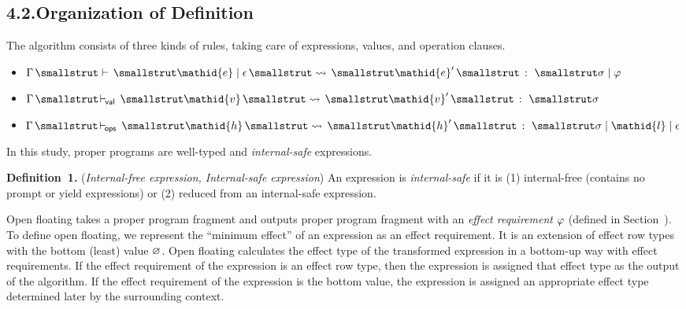 \documentclass{llncs}
\newcommand{\midbar}{\mid}
\newcommand{\xcolon}{\,:\,}
\begin{document}
\subsection{4.2.\hspace*{0.5em}Organization of Definition}%

\noindent The algorithm consists of three kinds of rules, taking care of expressions, values, and operation clauses.%

\begin{itemize}[noitemsep,topsep=\mdcompacttopsep]%

\item$\mathpre{\Gamma{}~\vdash{}~\mathid{e}\midbar{}{\epsilon}~{\;\rightsquigarrow}\;~\mathid{e}'~\xcolon{}~{\sigma}\midbar{}\varphi}$%

\item$\mathpre{\Gamma{}~\!\vdash_{\!\textsf{val}}~\mathid{v}~{\;\rightsquigarrow}\;~\mathid{v}'~\xcolon{}~{\sigma}}$%

\item$\mathpre{\Gamma{}~\!\vdash_{\!\textsf{ops}}~\mathid{h}~{\;\rightsquigarrow}\;~\mathid{h}'~\xcolon{}~{\sigma}\midbar{}\mathid{l}\midbar{}{\epsilon}}$%
\end{itemize}%

\noindent In this study, proper programs are well-typed and \emph{internal-safe} expressions.%

\begin{mdbmarginx}{1ex}{0pt}{1ex}{0pt}%
\noindent\textbf{Definition~1.} ({\itshape Internal-free expression, Internal-safe expression})\mdbr
An expression is \emph{internal-safe} if it is
(1) internal-free (contains no prompt or yield expressions) or
(2) reduced from an internal-safe expression.%
\end{mdbmarginx}%

\noindent Open floating takes a proper program fragment and outputs
proper program fragment with an \emph{effect requirement} $\mathpre{\varphi}$ (defined in Section~).
To define open floating, we represent the \textquotedblleft{}minimum effect\textquotedblright{} of an expression as an effect requirement.
It is an extension of effect row types with the bottom (least) value $\mathpre{\varnothing{}}$.
Open floating calculates the effect type of the transformed expression in a bottom-up way with effect requirements.
If the effect requirement of the expression is an effect row type,
then the expression is assigned that effect type as the output of the algorithm.
If the effect requirement of the expression is the bottom value,
the expression is assigned an appropriate effect type determined later by the surrounding context.%
\end{document}
